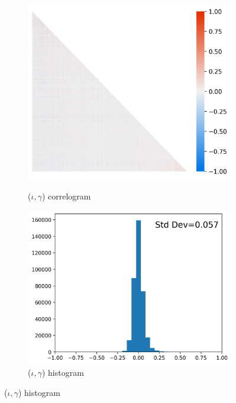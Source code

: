 \documentclass[12pt]{article}
\def\g{\gamma}
\def\i{\iota}
\theoremstyle{definition}
\theoremstyle{plain}
\begin{document}
\def\w{.45}
\begin{figure}[!htbp]
	\centering
	\caption{Skill Correlation Across Worker Types and Occupations}
	\begin{subfigure}[b]{\w\textwidth}
		\centering
		\caption{($\i,\g$) correlogram}
		\includegraphics[height=.25\textheight]{../Results/correlograms_iota_gamma_sorted}
		\label{fig:correlograms_iota_gamma_sorted}
	\end{subfigure}\hfill
	\begin{subfigure}[b]{\w\textwidth}
		\centering
		\caption{($\i,\g$) histogram}
		\includegraphics[height=.25\textheight]{../Results/correlograms_hist_iota_gamma_sorted}

\end{subfigure}
\end{figure}
\end{document}
